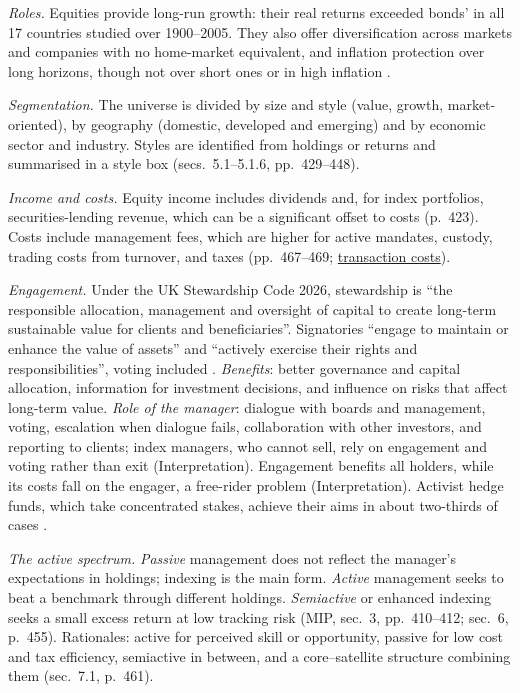 \begin{qfdefinition}\label{def:equity-portfolio-roles-mandate}
 \emph{Roles.} Equities provide long-run growth: their real returns exceeded bonds' in all 17 countries studied over 1900--2005. They also offer diversification across markets and companies with no home-market equivalent, and inflation protection over long horizons, though not over short ones or in high inflation \citep[chap.~7, sec.~2, pp.~408--410]{managing-investment-portfolios-2007}.

\emph{Segmentation.} The universe is divided by size and style (value, growth, market-oriented), by geography (domestic, developed and emerging) and by economic sector and industry. Styles are identified from holdings or returns and summarised in a style box (secs.~5.1--5.1.6, pp.~429--448).

\emph{Income and costs.} Equity income includes dividends and, for index portfolios, securities-lending revenue, which can be a significant offset to costs (p.~423). Costs include management fees, which are higher for active mandates, custody, trading costs from turnover, and taxes (pp.~467--469; \hyperref[def:transaction-costs]{transaction costs}).

\emph{Engagement.} Under the UK Stewardship Code 2026, stewardship is ``the responsible allocation, management and oversight of capital to create long-term sustainable value for clients and beneficiaries''. Signatories ``engage to maintain or enhance the value of assets'' and ``actively exercise their rights and responsibilities'', voting included \citep[pp.~5 and~12, Principles~3--4]{uk-stewardship-code-2026}. \emph{Benefits}: better governance and capital allocation, information for investment decisions, and influence on risks that affect long-term value. \emph{Role of the manager}: dialogue with boards and management, voting, escalation when dialogue fails, collaboration with other investors, and reporting to clients; index managers, who cannot sell, rely on engagement and voting rather than exit (Interpretation). Engagement benefits all holders, while its costs fall on the engager, a free-rider problem (Interpretation). Activist hedge funds, which take concentrated stakes, achieve their aims in about two-thirds of cases \citep[abstract, p.~1729]{wide-brav-activism}.

\emph{The active spectrum.} \emph{Passive} management does not reflect the manager's expectations in holdings; indexing is the main form. \emph{Active} management seeks to beat a benchmark through different holdings. \emph{Semiactive} or enhanced indexing seeks a small excess return at low tracking risk (MIP, sec.~3, pp.~410--412; sec.~6, p.~455). Rationales: active for perceived skill or opportunity, passive for low cost and tax efficiency, semiactive in between, and a core--satellite structure combining them (sec.~7.1, p.~461).


\end{qfdefinition}
